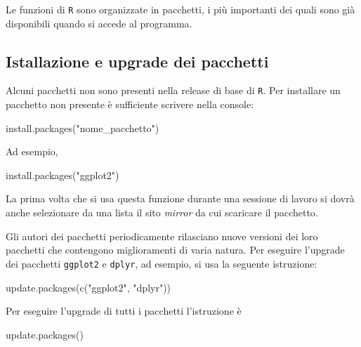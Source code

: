 \documentclass[
]{memoir}
\newenvironment{Shaded}{\begin{snugshade}}{\end{snugshade}}
\newcommand{\FunctionTok}[1]{\textcolor[rgb]{0.00,0.00,0.00}{#1}}
\newcommand{\NormalTok}[1]{#1}
\newcommand{\StringTok}[1]{\textcolor[rgb]{0.31,0.60,0.02}{#1}}
\theoremstyle{definition}
\theoremstyle{definition}
\theoremstyle{definition}
\theoremstyle{definition}
\theoremstyle{remark}
\begin{document}
Le funzioni di \texttt{R} sono organizzate in pacchetti, i più importanti dei
quali sono già disponibili quando si accede al programma.

\hypertarget{istallazione-e-upgrade-dei-pacchetti}{%
\subsection{Istallazione e upgrade dei pacchetti}\label{istallazione-e-upgrade-dei-pacchetti}}

Alcuni pacchetti non sono presenti nella release di base di \texttt{R}. Per
installare un pacchetto non presente è sufficiente scrivere nella
console:

\begin{Shaded}
\begin{Highlighting}[]
\FunctionTok{install.packages}\NormalTok{(}\StringTok{"nome\_pacchetto"}\NormalTok{)}
\end{Highlighting}
\end{Shaded}

Ad esempio,

\begin{Shaded}
\begin{Highlighting}[]
\FunctionTok{install.packages}\NormalTok{(}\StringTok{"ggplot2"}\NormalTok{)}
\end{Highlighting}
\end{Shaded}

La prima volta che si usa questa funzione durante una sessione di lavoro
si dovrà anche selezionare da una lista il sito \emph{mirror} da cui
scaricare il pacchetto.

Gli autori dei pacchetti periodicamente rilasciano nuove versioni dei
loro pacchetti che contengono miglioramenti di varia natura. Per
eseguire l'upgrade dei pacchetti \texttt{ggplot2} e \texttt{dplyr}, ad esempio, si usa
la seguente istruzione:

\begin{Shaded}
\begin{Highlighting}[]
\FunctionTok{update.packages}\NormalTok{(}\FunctionTok{c}\NormalTok{(}\StringTok{"ggplot2"}\NormalTok{, }\StringTok{"dplyr"}\NormalTok{))}
\end{Highlighting}
\end{Shaded}

Per eseguire l'upgrade di tutti i pacchetti l'istruzione è

\begin{Shaded}
\begin{Highlighting}[]
\FunctionTok{update.packages}\NormalTok{()}
\end{Highlighting}
\end{Shaded}
\end{document}
